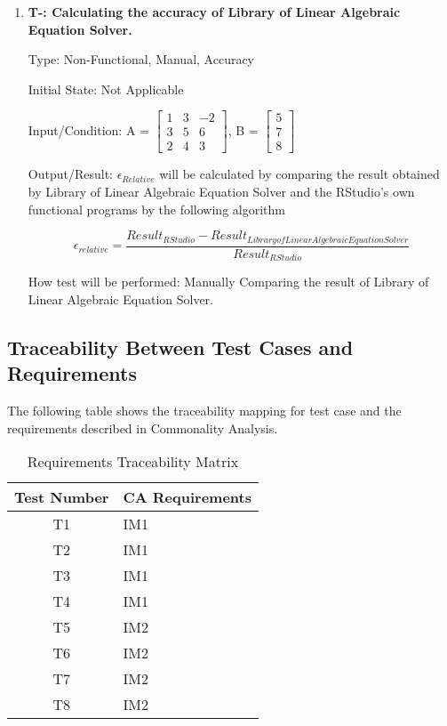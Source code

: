 \documentclass[12pt, titlepage]{article}
\newcounter{tnum}
\begin{document}
\begin{enumerate}

\item{\textbf{T-\thetnum \label{t-speed}: Calculating the accuracy of  Library of Linear Algebraic Equation Solver.}}


Type: Non-Functional, Manual, Accuracy
					
Initial State: Not Applicable
					
Input/Condition: A = $\begin{bmatrix} 
1 & 3 & -2 \\
3 & 5 & 6\\
2 & 4 & 3
\end{bmatrix}$, B = $\begin{bmatrix} 
5\\
7\\
8 
\end{bmatrix}$
					
Output/Result: $\epsilon_{Relative}$ will be calculated by comparing the result
obtained by Library of Linear Algebraic Equation Solver and the RStudio's own
functional programs by the following algorithm

\[\epsilon_{relative} = \frac{Result_{RStudio} - Result_{Library of Linear Algebraic Equation Solver}}{Result_{RStudio}}\]
					
How test will be performed: Manually Comparing the result of Library of Linear Algebraic Equation Solver.
					
\end{enumerate}



\subsection{Traceability Between Test Cases and Requirements}

The following table shows the traceability mapping for test case and the requirements described in Commonality Analysis.

\begin{table} [H]
  \caption{Requirements Traceability Matrix}
  \label{Table:Table_Traceability}  
\begin{tabular}{|c|p{8cm}|}
  \hline	
  \textbf{Test Number} & \textbf{CA Requirements}\\
  \hline 
   T1& IM1\\ \hline
   T2& IM1\\ \hline
   T3& IM1\\ \hline
   T4& IM1\\ \hline
   T5& IM2\\ \hline
   T6& IM2\\ \hline
   T7& IM2\\ \hline
   T8& IM2\\ \hline
   
  

\end{tabular}\\
\end{table}
\end{document}
